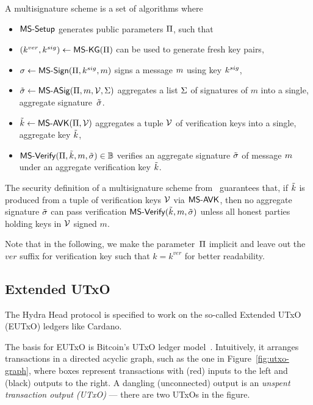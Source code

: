 \noindent A multisignature scheme is a set of algorithms where
\begin{itemize}
  \item $\mathsf{MS\textsf{-}{}Setup}$ generates public parameters $\Pi$, such that
  \item $(k^{ver},k^{sig}) \gets \mathsf{MS\textsf{-}{}KG}(\Pi)$ can be used to generate fresh
        key pairs,
  \item $\sigma \gets \mathsf{MS\textsf{-}{}Sign}(\Pi,k^{sig},m)$ signs a message $m$
        using key $k^{sig}$,
  \item $\tilde\sigma \gets \mathsf{MS\textsf{-}{}ASig}(\Pi,m,\mathcal{V},\Sigma)$ aggregates a
        list $\Sigma$  of signatures of $m$ into a single, aggregate
        signature~$\tilde\sigma$.
  \item $\tilde{k} \gets \mathsf{MS\textsf{-}{}AVK}(\Pi,\mathcal{V})$ aggregates a tuple $\mathcal{V}$
        of verification keys into a single, aggregate key $\tilde{k}$,
  \item $\mathsf{MS\textsf{-}{}Verify}(\Pi,\tilde{k},m,\tilde\sigma) \in \mathbb{B}$ verifies an aggregate
        signature $\tilde\sigma$ of message $m$ under an aggregate verification
        key $\tilde{k}$.
\end{itemize}

The security definition of a multisignature scheme
from~\cite{itakura1983public,CCS:MicOhtRey01} guarantees that, if $\tilde{k}$ is
produced from a tuple of verification keys $\mathcal{V}$ via $\mathsf{MS\textsf{-}{}AVK}$, then no
aggregate signature $\tilde\sigma$ can pass verification
$\mathsf{MS\textsf{-}{}Verify}(\tilde{k},m,\tilde\sigma)$ unless all honest parties holding keys in
$\mathcal{V}$ signed $m$.

Note that in the following, we make the parameter~$\Pi$ implicit and leave
out the $ver$ suffix for verification key such that $k = k^{ver}$ for better
readability.

\subsection{Extended UTxO}\label{sec:eutxo}
The Hydra Head protocol is specified to work on the so-called Extended UTxO (EUTxO) ledgers
like Cardano.

The basis for EUTxO is Bitcoin's UTxO ledger
model~\cite{formal-model-of-bitcoin-transactions,Zahnentferner18-UTxO}.
Intuitively, it arranges transactions in a directed acyclic graph, such as the
one in Figure~\ref{fig:utxo-graph}, where boxes represent transactions with
(red) inputs to the left and (black) outputs to the right. A dangling
(unconnected) output is an \emph{unspent transaction output (UTxO)} --- there
are two UTxOs in the figure.

